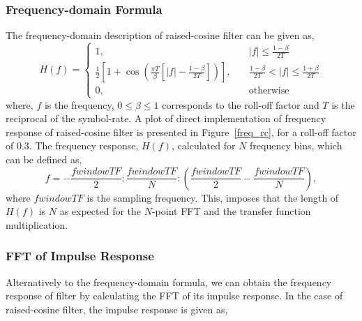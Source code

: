 \subsubsection{Frequency-domain Formula}

The frequency-domain description of raised-cosine filter can be given as,
$$
H(f) = \left\{
    \begin{array}{ll}
        1,       & \quad \left|f\right| \leq \frac{1-\beta}{2T} \\
    \frac{1}{2}\left[ 1+\cos\left(\frac{\pi T}{\beta}\left[\left|f\right| - \frac{1-\beta}{2T}\right]\right)\right],  & \quad \frac{1-\beta}{2T} < \left|f\right| \leq \frac{1+\beta}{2T}\\
    0, & \quad \text{otherwise}
    \end{array}
\right.
$$
where, $f$ is the frequency, $0 \leq \beta \leq 1$ corresponds to the roll-off factor and $T$ is the reciprocal of the symbol-rate.
A plot of direct implementation of frequency response of raised-cosine filter is presented in Figure~\ref{freq_rc}, for a roll-off factor of 0.3.
The frequency response, $H(f)$, calculated for $N$ frequency bins, which can be defined as,
\begin{equation}
    f= -\frac{fwindowTF}{2}:\frac{fwindowTF}{N}:\left(\frac{fwindowTF}{2}-\frac{fwindowTF}{N}\right),
    \label{freq}
\end{equation}
where $fwindowTF$ is the sampling frequency. This, imposes that the length of $H(f)$ is $N$ as expected for the $N$-point FFT and the transfer function multiplication.
\subsubsection{FFT of Impulse Response}
Alternatively to the frequency-domain formula, we can obtain the frequency response of filter by calculating the FFT of its impulse response. In the case of raised-cosine filter, the impulse response is given as,

